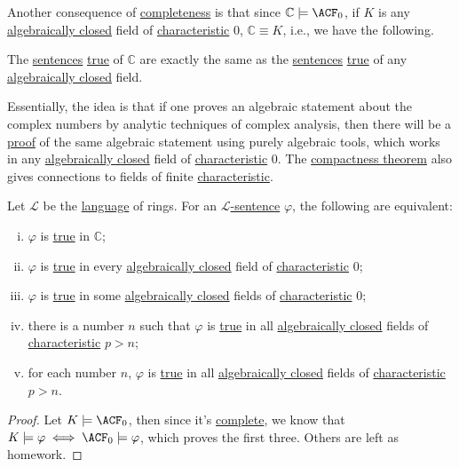 Another consequence of \hyperref[def:theory-complete]{completeness} is that since \(\mathbb{C} \models \ACF_0\), if \(K\) is any \hyperref[def:algebraically-closed]{algebraically closed} field of \hyperref[def:characteristic]{characteristic} \(0\), \(\mathbb{C} \equiv K\), i.e., we have the following.

\begin{remark}
	The \hyperref[def:sentence]{sentences} \hyperref[def:truth]{true} of \(\mathbb{C} \) are exactly the same as the \hyperref[def:sentence]{sentences} \hyperref[def:truth]{true} of any \hyperref[def:algebraically-closed]{algebraically closed} field.
\end{remark}

Essentially, the idea is that if one proves an algebraic statement about the complex numbers by analytic techniques of complex analysis, then there will be a \hyperref[def:proof]{proof} of the same algebraic statement using purely algebraic tools, which works in any \hyperref[def:algebraically-closed]{algebraically closed} field of \hyperref[def:characteristic]{characteristic} \(0\). The \hyperref[thm:compactness]{compactness theorem} also gives connections to fields of finite \hyperref[def:characteristic]{characteristic}.

\begin{theorem}\label{thm:Leftschetz-principle}
	Let \(\mathcal{L} \) be the \hyperref[def:language]{language} of rings. For an \hyperref[def:sentence]{\(\mathcal{L}\)-sentence} \(\varphi \), the following are equivalent:
	\begin{enumerate}[(i)]
		\item \(\varphi \) is \hyperref[def:truth]{true} in \(\mathbb{C}\);
		\item \(\varphi \) is \hyperref[def:truth]{true} in every \hyperref[def:algebraically-closed]{algebraically closed} field of \hyperref[def:characteristic]{characteristic} \(0\);
		\item \(\varphi \) is \hyperref[def:truth]{true} in some \hyperref[def:algebraically-closed]{algebraically closed} fields of \hyperref[def:characteristic]{characteristic} \(0\);
		\item there is a number \(n\) such that \(\varphi \) is \hyperref[def:truth]{true} in all \hyperref[def:algebraically-closed]{algebraically closed} fields of \hyperref[def:characteristic]{characteristic} \(p > n\);
		\item for each number \(n\), \(\varphi \) is \hyperref[def:truth]{true} in all \hyperref[def:algebraically-closed]{algebraically closed} fields of \hyperref[def:characteristic]{characteristic} \(p>n\).
	\end{enumerate}
\end{theorem}
\begin{proof}
	Let \(K \models \ACF_0\), then since it's \hyperref[def:theory-complete]{complete}, we know that \(K \models \varphi \iff \ACF_0 \models \varphi\), which proves the first three. Others are left as homework.
\end{proof}

